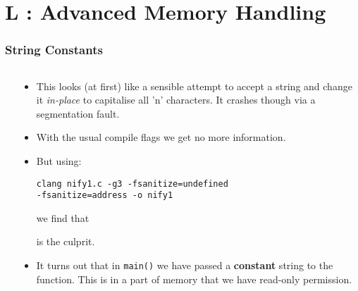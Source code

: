 \section{L : Advanced Memory Handling}
\label{chap:advmem}


\begin{frame}[fragile]
\frametitle{String Constants}
\begin{columns}[T]

\begin{column}{0.35\textwidth}

\end{column}

\pause
\begin{column}{0.55\textwidth}
\begin{itemize}[<+->]
\item This looks (at first) like a sensible attempt to accept a string and change it {\em in-place} to capitalise all 'n' characters.
It crashes though via a segmentation fault.
\item With the usual compile flags we get no more information.
\item But using:
\begin{verbatim}
clang nify1.c -g3 -fsanitize=undefined
-fsanitize=address -o nify1
\end{verbatim}
we find that

is the culprit.
\item It turns out that in \verb^main()^ we have passed a {\bf constant} string to the function. This is in a part of memory that we have read-only permission.
\end{itemize}
\end{column}

\end{columns}
\end{frame}


